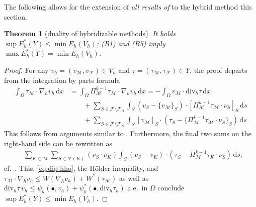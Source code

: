 \documentclass[a4paper]{amsart}
\numberwithin{equation}{section}
\renewcommand{\d}[1]{\,\mathrm{d}#1}
\renewcommand{\div}{\mathrm{div}}
\newcommand{\Mcal}{\mathcal{M}}
\newtheorem{theorem}{Theorem}[section]
\theoremstyle{remark}
\begin{document}
The following   allows for the extension of {\em all results of } to the hybrid method this section.


\begin{theorem}[duality of hybridizable methods]\label{thm:duality-hybrid}
	It holds $\sup E^*_h(Y) \leq \min E_h(V_h)$; 
	(B1) and (B5) imply
    $\max E_h^*(Y) = \min E_h(V_h)$.
\end{theorem}

\begin{proof}
For any $v_h = (v_\Mcal, v_\mathcal{F}) \in V_h$ and $\tau = (\tau_\Mcal, \tau_\mathcal{F}) \in Y$, the proof departs from the integration by parts formula
	\begin{align}\label{eq:dip-hho}
		\int_\Omega \tau_\Mcal \cdot \nabla_h v_h \d{x} &= \int_\Omega \Pi_{\Mcal}^{k-1} \tau_\Mcal \cdot \nabla_h v_h \d{x} = - \int_\Omega v_\Mcal \cdot \div_h \tau \d{x}\nonumber\\ 
		&\qquad+ \sum_{S \in \mathcal{F}\setminus\mathcal{F}_\mathrm{D}} \int_S (v_S - \{v_\Mcal\}_S) \cdot [\Pi_{\Mcal}^{k-1} \tau_\Mcal \cdot \nu_S]_S \d{s}\nonumber\\
		&\qquad + \sum_{S \in \mathcal{F}\setminus\mathcal{F}_\mathrm{N}} \int_S [v_\Mcal]_S \cdot (\tau_S - \{\Pi_{\Mcal}^{k-1} \tau_\Mcal \cdot \nu_S\}_S) \d{s}
	\end{align}
This follows from arguments similar to \cite[Lemma 3.2]{Tran2024}. 
Furthermore, the final two sums on the right-hand side can be rewritten as
	\begin{align*}
		- \sum_{K \in \mathcal{M}} \sum_{S \in \mathcal{F}(K)} (\nu_S \cdot \nu_K) \int_S (v_S - v_K) \cdot (\tau_S - \Pi_\Mcal^{k-1}\tau_K \cdot \nu_S) \d{s},
	\end{align*}
	cf.~\cite[Proof of Theorem 3.1]{Tran2024}. This, \eqref{eq:dip-hho}, the H\"older inequality, and $\tau_\Mcal \cdot \nabla_h v_h \leq W(\nabla_h v_h) + W^*(\tau_\Mcal)$ as well as $\div_h \tau \, v_h \leq \psi_h(\bullet,v_h) + \psi_h^*(\bullet,\div_h \tau_h)$ a.e.~in $\Omega$ conclude $\sup E^*_h(Y) \leq \min E_h(V_h)$.
    

\end{proof}
\end{document}
